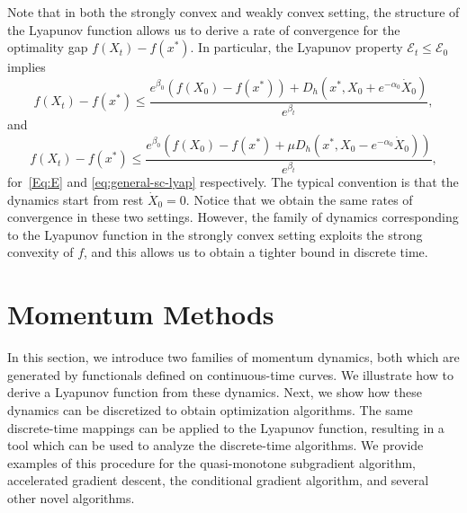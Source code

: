 \documentclass[11pt]{article}
\theoremstyle{plain}
\newcommand{\E}{{\mathcal E}}
\begin{document}
Note that in both the strongly convex and weakly convex setting, the structure of the Lyapunov function allows us to derive a rate of convergence for the optimality gap $f(X_t) - f(x^\ast)$. In particular, the Lyapunov property $\E_t \leq \E_0$ implies 
\begin{equation}\label{eq:Guarantee1}
f(X_t) - f(x^\ast) \leq \frac{e^{\beta_0}(f(X_0) - f(x^\ast)) + D_h(x^\ast, X_0 + e^{-\alpha_0} \dot X_0)}{e^{\beta_t}},
\end{equation}
and 
\begin{equation}
f(X_t) - f(x^\ast) \leq \frac{e^{\beta_0}(f(X_0) - f(x^\ast) +\mu D_h(x^\ast ,X_0 -e^{-\alpha_0} \dot X_0))}{e^{\beta_t}},
\end{equation}
for~\eqref{Eq:E} and \eqref{eq:general-sc-lyap} respectively. The typical convention is that the dynamics start from rest $\dot X_0 = 0$. Notice that we obtain the same rates of convergence in these two settings. However, the family of dynamics corresponding to the Lyapunov function in the strongly convex setting exploits the strong convexity of $f$, and this allows us to obtain a tighter bound in discrete time.


\section{Momentum Methods}
\label{Sec:MomLyap}
In this section, we introduce two families of momentum dynamics, both which are generated by functionals defined on continuous-time curves. We illustrate how to derive a Lyapunov function from these dynamics. Next, we show how these dynamics can be discretized to obtain optimization algorithms. The same discrete-time mappings can be applied to the Lyapunov function, resulting in a tool which can be used to analyze the discrete-time algorithms. We provide examples of this procedure for the quasi-monotone subgradient algorithm, accelerated gradient descent, the conditional gradient algorithm, and several other novel algorithms. 
\end{document}
